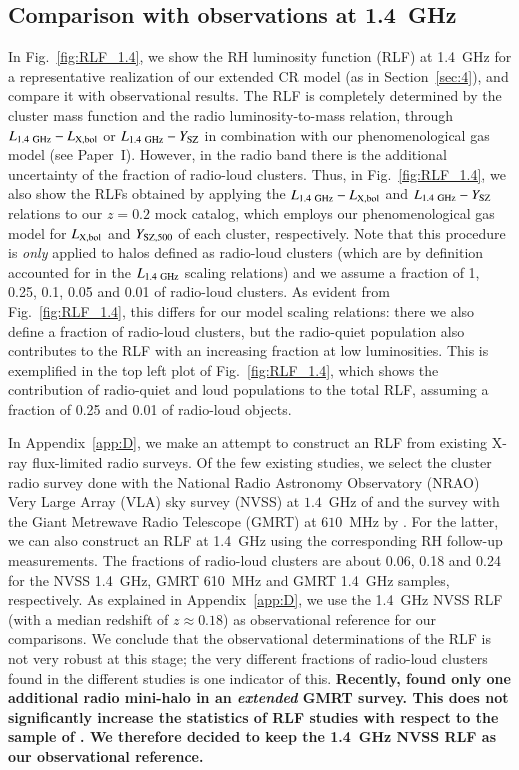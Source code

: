 \documentclass[useAMS,usenatbib]{mn2e}
\begin{document}
\subsection{Comparison with observations at 1.4~GHz}

In Fig.~\ref{fig:RLF_1.4}, we show the RH luminosity function (RLF) at 1.4~GHz
for a representative realization of our extended CR model (as in
Section~\ref{sec:4}), and compare it with observational results.  The RLF is
completely determined by the cluster mass function and the radio
luminosity-to-mass relation, through $L_{1.4~{\mathrm{GHz}}}-L_{ {\mathrm{X,bol}}}$ or
$L_{1.4~{\mathrm{GHz}}}-Y_{{\mathrm{SZ}}}$ in combination with our phenomenological gas
model (see Paper~I). However, in the radio band there is the additional
uncertainty of the fraction of radio-loud clusters. Thus, in
Fig.~\ref{fig:RLF_1.4}, we also show the RLFs obtained by applying the
$L_{1.4~{\mathrm{GHz}}}-L_{{\mathrm{X,bol}}}$ and $L_{1.4~{\mathrm{GHz}}}-Y_{{\mathrm{SZ}}}$
relations to our $z = 0.2$ mock catalog, which employs our phenomenological gas
model for $L_{{\mathrm{X,bol}}}$ and $Y_{{\mathrm{SZ}}, 500}$ of each cluster,
respectively. Note that this procedure is {\em only} applied to halos defined as
radio-loud clusters (which are by definition accounted for in the
$L_{1.4~{\mathrm{GHz}}}$ scaling relations) and we assume a fraction of 1, 0.25, 0.1,
0.05 and 0.01 of radio-loud clusters. As evident from Fig.~\ref{fig:RLF_1.4},
this differs for our model scaling relations: there we also define a fraction of
radio-loud clusters, but the radio-quiet population also contributes to the RLF
with an increasing fraction at low luminosities. This is exemplified in the top
left plot of Fig.~\ref{fig:RLF_1.4}, which shows the contribution of radio-quiet
and loud populations to the total RLF, assuming a fraction of 0.25 and 0.01 of
radio-loud objects.

In Appendix~\ref{app:D}, we make an attempt to construct an RLF from existing
X-ray flux-limited radio surveys. Of the few existing studies, we select the
cluster radio survey done with the National Radio Astronomy Observatory (NRAO)
Very Large Array (VLA) sky survey (NVSS) at $1.4$~GHz of
\cite{1999NewA....4..141G} and the survey with the Giant Metrewave Radio
Telescope (GMRT) at $610$~MHz by \cite{VenturiGMRT_1,VenturiGMRT_2}. For the
latter, we can also construct an RLF at 1.4~GHz using the corresponding RH
follow-up measurements. The fractions of radio-loud clusters are about 0.06,
0.18 and 0.24 for the NVSS 1.4~GHz, GMRT 610~MHz and GMRT 1.4~GHz samples,
respectively. As explained in Appendix~\ref{app:D}, we use the 1.4~GHz NVSS RLF
(with a median redshift of $z \approx 0.18$) as observational reference for our
comparisons. We conclude that the observational determinations of the RLF is not
very robust at this stage; the very different fractions of radio-loud clusters
found in the different studies is one indicator of this. {\bf Recently,
  \cite{2013arXiv1306.3102K} found only one additional radio mini-halo in an
  \emph{extended} GMRT survey. This does not significantly increase the
  statistics of RLF studies with respect to the sample of
  \cite{VenturiGMRT_1,VenturiGMRT_2}. We therefore decided to keep the 1.4~GHz
  NVSS RLF as our observational reference.}
  
\end{document}
